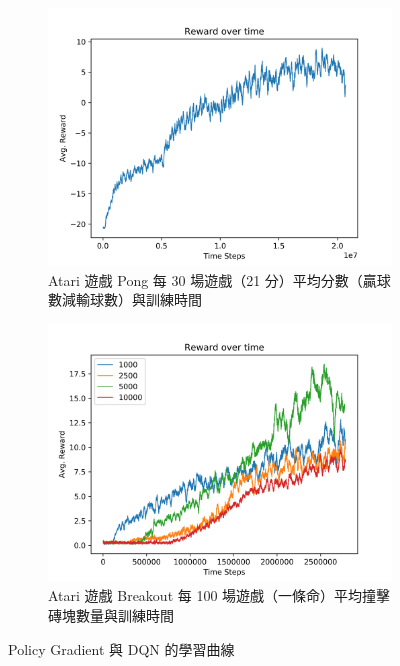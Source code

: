 \documentclass[fleqn,a4paper,12pt]{article}
\begin{document}
\begin{figure}[h]
\centering
\begin{subfigure}{.45\textwidth}
  \includegraphics[width=\linewidth]{figures/pg.png}
  \caption{Atari 遊戲 Pong 每 30 場遊戲（21 分）平均分數（贏球數減輸球數）與訓練時間}
  \label{fig:learning-curve-pg}
\end{subfigure}
\begin{subfigure}{.45\textwidth}
  \includegraphics[width=\linewidth]{figures/dqn-update-freq.png}
  \caption{Atari 遊戲 Breakout 每 100 場遊戲（一條命）平均撞擊磚塊數量與訓練時間}
  \label{fig:learning-curve-dqn}
\end{subfigure}
\label{fig:learning-curve}
\caption{Policy Gradient 與 DQN 的學習曲線}
\end{figure}
\end{document}
